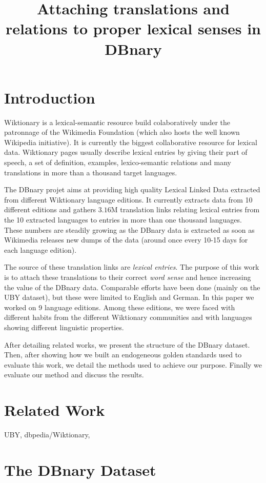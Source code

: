 \documentclass[10pt, a4paper]{article}
\title{Attaching translations and relations to proper lexical senses in DBnary}
\begin{document}
\maketitleabstract

\section{Introduction}

 Wiktionary is a lexical-semantic resource build colaboratively under the patronnage of the Wikimedia Foundation (which also hosts the well known Wikipedia initiative). It is currently the biggest collaborative resource for lexical data. Wiktionary pages usually describe lexical entries by giving their part of speech, a set of definition, examples, lexico-semantic relations and many translations in more than a thousand target languages.

The DBnary projet \cite{serasset:dbnary-swj} aims at providing high quality Lexical Linked Data extracted from different Wiktionary language editions. It currently extracts data from 10 different editions and gathers $3.16$M translation links relating lexical entries from the 10 extracted languages to entries in more than one thousand languages. These numbers are steadily growing as the DBnary data is extracted as soon as Wikimedia releases new dumps of the data (around once every 10-15 days for each language edition).

The source of these translation links are \emph{lexical entries}. The purpose of this work is to attach these translations to their correct \emph{word sense} and hence increasing the value of the DBnary data. Comparable efforts have been done (mainly on the UBY dataset), but these were limited to English and German. In this paper we worked on 9 language editions. Among these editions, we were faced with different habits from the different Wiktionary communities and with languages showing different linguistic properties. 

After detailing related works, we present the structure of the DBnary dataset. Then, after showing how we built an endogeneous golden standards used to evaluate this work, we detail the methods used to achieve our purpose. Finally we evaluate our method and discuss the results.

\section{Related Work}

UBY, dbpedia/Wiktionary, 

\section{The DBnary Dataset}
\end{document}
